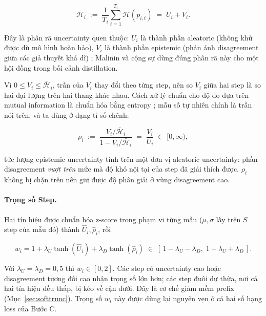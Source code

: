 \documentclass[12pt,a4paper]{article}
\begin{document}
\begin{equation}
\label{eq:decomp}
\bar{\mathcal{H}}_i
\;:=\;
\frac{1}{T_i}\sum_{t=1}^{T_i}\mathcal{H}\!\left(\bar{p}_{i,t}\right)
\;=\;
U_i + V_i .
\end{equation}

Đây là phân rã uncertainty quen thuộc: $U_i$ là thành phần aleatoric (không khử được dù mô hình hoàn hảo), $V_i$ là thành phần epistemic (phản ánh disagreement giữa các giả thuyết khả dĩ) \cite{houlsby2011bald,depeweg2018decomposition}; Malinin và cộng sự \cite{malinin2020endd} dùng đúng phân rã này cho một hội đồng trong bối cảnh distillation.

Vì $0 \le V_i \le \bar{\mathcal{H}}_i$, trần của $V_i$ thay đổi theo từng step, nên so $V_i$ giữa hai step là so hai đại lượng trên hai thang khác nhau. Cách xử lý chuẩn cho độ đo dựa trên mutual information là chuẩn hóa bằng entropy \cite{nguyen2010nmi}; mẫu số tự nhiên chính là trần nói trên, và ta dùng ở dạng tỉ số chênh:

\begin{equation}
\label{eq:rho}
\rho_i \;:=\; \frac{V_i / \bar{\mathcal{H}}_i}{1 - V_i / \bar{\mathcal{H}}_i} \;=\; \frac{V_i}{U_i} \;\in\; [0,\infty),
\end{equation}

tức lượng epistemic uncertainty tính trên một đơn vị aleatoric uncertainty: phần disagreement \emph{vượt trên} mức mà độ khó nội tại của step đã giải thích được. $\rho_i$ không bị chặn trên nên giữ được độ phân giải ở vùng disagreement cao.

\paragraph{Trọng số Step.}
Hai tín hiệu được chuẩn hóa z-score trong phạm vi từng mẫu ($\mu, \sigma$ lấy trên $S$ step của mẫu đó) thành $\hat{U}_i, \hat{\rho}_i$, rồi

\begin{equation}
\label{eq:w}
w_i = 1 + \lambda_U \tanh(\hat{U}_i) + \lambda_D \tanh(\hat{\rho}_i)
\;\in\; [\,1-\lambda_U-\lambda_D,\; 1+\lambda_U+\lambda_D\,].
\end{equation}

Với $\lambda_U = \lambda_D = 0{,}5$ thì $w_i \in [0,2]$. Các step có uncertainty cao hoặc disagreement tương đối cao nhận trọng số lớn hơn; các step đuôi dư thừa, nơi cả hai tín hiệu đều thấp, bị kéo về cận dưới. Đây là cơ chế giảm mềm prefix (Mục~\ref{sec:softtrunc}). Trọng số $w_i$ này được dùng lại nguyên vẹn ở cả hai số hạng loss của Bước C.
\end{document}
